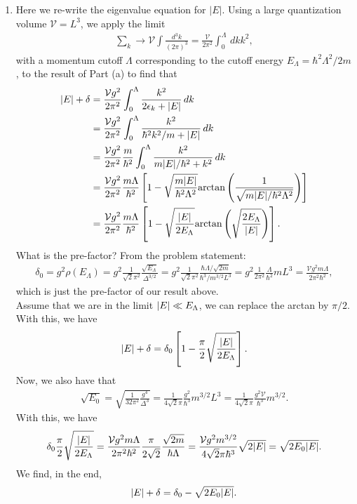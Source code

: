 \documentclass{article}
\theoremstyle{definition}
\newcommand{\f}[2]{\frac{#1}{#2}}
\newcommand{\lp}{\left(}
\newcommand{\rp}{\right)}
\newcommand{\lb}{\left[}
\newcommand{\rb}{\right]}
\begin{document}
\begin{enumerate}[label=(\alph*)]
\item Here we re-write the eigenvalue equation for $|E|$. Using a large quantization volume $\mathcal{V} = L^3$, we apply the limit
\begin{align*}
\sum_k \to \mathcal{V} \int \f{d^3 k }{ (2\pi)^3} = \f{\mathcal{V}}{2\pi^2} \int_0^\Lambda \,dk k^2,
\end{align*}
with a momentum cutoff $\Lambda$ corresponding to the cutoff energy $E_\Lambda  = \hbar^2 \Lambda^2 / 2m$, to the result of Part (a) to find that
\begin{align*}
\abs{E} + \delta 
&=  \f{\mathcal{V} g^2 }{2\pi^2} \int_0^\Lambda \f{k^2}{2\epsilon_k + \abs{E}} \, dk \\
&=  \f{\mathcal{V} g^2 }{2\pi^2} \int_0^\Lambda \f{k^2}{\hbar^2 k^2/m + \abs{E}} \, dk  \\
&=  \f{\mathcal{V} g^2 }{2\pi^2} \f{m}{\hbar^2} \int_0^\Lambda  \f{k^2}{m \abs{E} / \hbar^2 + k^2}  \,dk  \\
&=  \f{\mathcal{V} g^2 }{2\pi^2} \f{m\Lambda}{\hbar^2} \lb 1 - \sqrt{\f{m\abs{E}}{\hbar^2\Lambda^2}} \text{arctan}\lp \f{1}{\sqrt{m\abs{E} / \hbar^2\Lambda^2}}  \rp \rb \\ 
&= \f{\mathcal{V} g^2 }{2\pi^2} \f{m\Lambda}{\hbar^2} \lb 1 -  \sqrt{\f{\abs{E}}{2E_\Lambda}} \text{arctan}\lp 
\sqrt{\f{2E_\Lambda}{\abs{E}}}
\rp \rb.
\end{align*}
What is the pre-factor? From the problem statement:
\begin{align*}
\delta_0 = g^2 \rho(E_\Lambda) = g^2 \f{1}{\sqrt{2} \pi^2} \f{\sqrt{E_\Lambda}}{ \Delta^{3/2}}  = g^2 \f{1}{\sqrt{2} \pi^2} \f{  \hbar \Lambda / \sqrt{2m}  }{  \hbar^3 / m^{3/2} L^3   }  = g^2 \f{1}{2 \pi^2} \f{\Lambda}{\hbar^2} mL^3 = \f{\mathcal{V} g^2 m\Lambda }{2\pi^2 \hbar^2 },
\end{align*}
which is just the pre-factor of our result above. \\

Assume that we are in the limit $\abs{E} \ll E_\Lambda$, we can replace the arctan by $\pi/2$. With this, we have
\begin{align*}
\abs{E} + \delta = \delta_0 \lb 1 - \f{\pi}{2} \sqrt{\f{\abs{E}}{2E_\Lambda}}   \rb.
\end{align*}
Now, we also have that
\begin{align*}
\sqrt{E_0} = \sqrt{\f{1}{32\pi^2} \f{g^4}{\Delta^3}} = \f{1}{4\sqrt{2} \pi} \f{g^2}{\hbar^3} m^{3/2} L^3 = 
\f{1}{4\sqrt{2} \pi} \f{g^2  \mathcal{V}}{\hbar^3} m^{3/2}.
\end{align*}
With this, we have
\begin{align*}
\delta_0 \f{\pi}{2} \sqrt{ \f{\abs{E}}{2E_\Lambda}  } = \f{\mathcal{V} g^2 m\Lambda }{2\pi^2 \hbar^2 } \f{\pi}{2\sqrt{2}}  \f{ \sqrt{2 m} }{\hbar \Lambda} = 
\f{\mathcal{V} g^2 m^{3/2} }{4\sqrt{2} \pi \hbar^3 }
\sqrt{2 \abs{E}}
= \sqrt{2 E_0 \abs{E}}.
\end{align*}
We find, in the end,
\begin{align*}
{\abs{E} + \delta = \delta_0 - \sqrt{2 E_0 \abs{E}}}.
\end{align*}



\end{enumerate}
\end{document}
